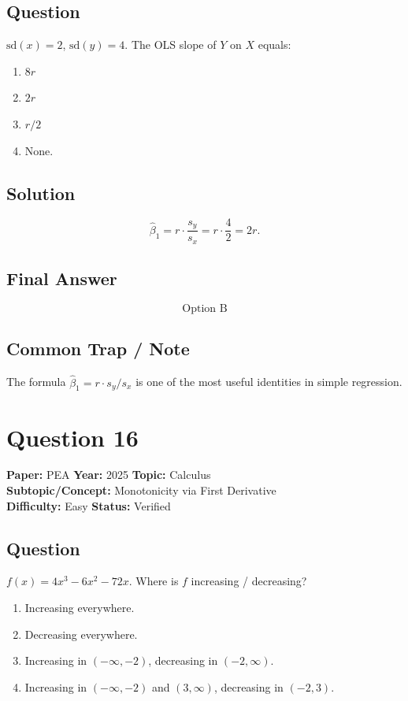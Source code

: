 \documentclass[11pt]{article}
\begin{document}
\subsection*{Question}
$\mathrm{sd}(x) = 2$, $\mathrm{sd}(y) = 4$. The OLS slope of $Y$ on $X$ equals:
\begin{enumerate}[label=(\Alph*)]
\item $8 r$ \item $2r$ \item $r/2$ \item None.
\end{enumerate}

\subsection*{Solution}
\[
\hat\beta_1 = r \cdot \frac{s_y}{s_x} = r \cdot \frac{4}{2} = 2r.
\]

\subsection*{Final Answer}
\[
\boxed{\text{Option B}}
\]

\subsection*{Common Trap / Note}
The formula $\hat\beta_1 = r \cdot s_y/s_x$ is one of the most useful identities in simple regression.

\section*{Question 16}
\textbf{Paper:} PEA \quad \textbf{Year:} 2025 \quad \textbf{Topic:} Calculus \\
\textbf{Subtopic/Concept:} Monotonicity via First Derivative \\
\textbf{Difficulty:} Easy \quad \textbf{Status:} Verified

\subsection*{Question}
$f(x) = 4x^3 - 6x^2 - 72x$. Where is $f$ increasing / decreasing?
\begin{enumerate}[label=(\Alph*)]
\item Increasing everywhere.
\item Decreasing everywhere.
\item Increasing in $(-\infty,-2)$, decreasing in $(-2,\infty)$.
\item Increasing in $(-\infty,-2)$ and $(3,\infty)$, decreasing in $(-2,3)$.
\end{enumerate}
\end{document}
